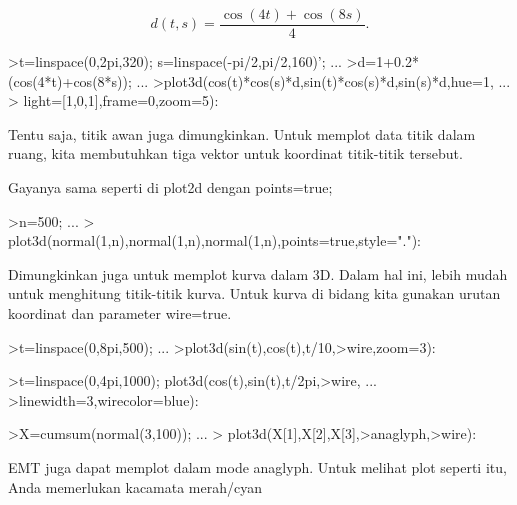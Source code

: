 \documentclass{article}
\begin{document}
\begin{eulernotebook}
\begin{eulercomment}
\begin{eulercomment}
\begin{eulercomment}
\end{eulercomment}
\begin{eulerformula}
\[
d(t,s) = \frac{\cos(4t)+\cos(8s)}{4}.
\]
\end{eulerformula}
\begin{eulerprompt}
>t=linspace(0,2pi,320); s=linspace(-pi/2,pi/2,160)'; ...
>d=1+0.2*(cos(4*t)+cos(8*s)); ...
>plot3d(cos(t)*cos(s)*d,sin(t)*cos(s)*d,sin(s)*d,hue=1, ...
>  light=[1,0,1],frame=0,zoom=5):
\end{eulerprompt}
\begin{eulercomment}
Tentu saja, titik awan juga dimungkinkan. Untuk memplot data titik
dalam ruang, kita membutuhkan tiga vektor untuk koordinat titik-titik
tersebut.

Gayanya sama seperti di plot2d dengan points=true;
\end{eulercomment}
\begin{eulerprompt}
>n=500;  ...
>  plot3d(normal(1,n),normal(1,n),normal(1,n),points=true,style="."):
\end{eulerprompt}
\begin{eulercomment}
Dimungkinkan juga untuk memplot kurva dalam 3D. Dalam hal ini, lebih
mudah untuk menghitung titik-titik kurva. Untuk kurva di bidang kita
gunakan urutan koordinat dan parameter wire=true.
\end{eulercomment}
\begin{eulerprompt}
>t=linspace(0,8pi,500); ...
>plot3d(sin(t),cos(t),t/10,>wire,zoom=3):
\end{eulerprompt}
\begin{eulerprompt}
>t=linspace(0,4pi,1000); plot3d(cos(t),sin(t),t/2pi,>wire, ...
>linewidth=3,wirecolor=blue):
\end{eulerprompt}
\begin{eulerprompt}
>X=cumsum(normal(3,100)); ...
> plot3d(X[1],X[2],X[3],>anaglyph,>wire):
\end{eulerprompt}
\begin{eulercomment}
EMT juga dapat memplot dalam mode anaglyph. Untuk melihat plot seperti
itu, Anda memerlukan kacamata merah/cyan
\end{eulercomment}
\begin{eulerprompt}

\end{eulerprompt}
\end{eulercomment}
\end{eulercomment}
\end{eulernotebook}
\end{document}
